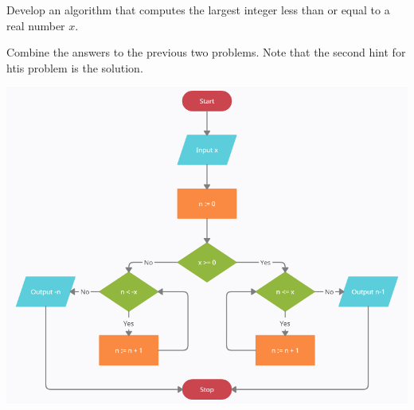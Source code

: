 \documentclass{ximera}
\begin{document}
\begin{question}
	Develop an algorithm that computes the largest integer less than or equal to a real number $x$.
	\begin{hint}
		Combine the answers to the previous two problems. Note that the second hint for htis problem is the solution.
	\end{hint}
	\begin{hint}
		\begin{center}
			\includegraphics{floor.png}
		\end{center}
	\end{hint}
\end{question}
\end{document}
